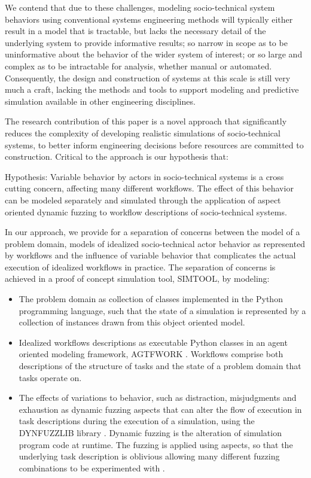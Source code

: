 \documentclass{llncs}
\begin{document}
We contend that due to these challenges, modeling socio-technical system behaviors using conventional systems
engineering methods will typically either result in a model that is tractable, but lacks the necessary detail of the
underlying system to provide informative results; so narrow in scope as to be uninformative about the behavior of the
wider system of interest; or so large and complex as to be intractable for analysis, whether manual or automated.
Consequently, the design and construction of systems at this scale is still very much a craft, lacking the methods and
tools to support modeling and predictive simulation available in other engineering disciplines.

The research contribution of this paper is a novel approach that significantly reduces the complexity of developing
realistic simulations of socio-technical systems, to better inform engineering decisions before resources are committed
to construction. Critical to the approach is our hypothesis that:

Hypothesis: Variable behavior by actors in socio-technical systems is a cross cutting concern, affecting many different
workflows. The effect of this behavior can be modeled separately and simulated through the application of aspect
oriented dynamic fuzzing to workflow descriptions of socio-technical systems.

In our approach, we provide for a separation of concerns between the model of a problem domain, models of idealized
socio-technical actor behavior as represented by workflows and the influence of variable behavior that complicates the
actual execution of idealized workflows in practice.  The separation of concerns is achieved in a proof of concept
simulation tool, SIMTOOL, by modeling:

 \begin{itemize}
 \item The problem domain as collection of classes implemented in the Python programming language, such that the
   state of a simulation is represented by a collection of instances drawn from this object oriented model.
 \item Idealized workflows descriptions as executable Python classes in an agent oriented modeling framework, AGTFWORK
   \cite{ANON}.  Workflows comprise both descriptions of the structure of tasks and the state of a problem domain that tasks
   operate on.
 \item The effects of variations to behavior, such as distraction, misjudgments and exhaustion as dynamic fuzzing
   aspects that can alter the flow of execution in task descriptions during the execution of a simulation, using the
   DYNFUZZLIB library \cite{ANON}.  Dynamic fuzzing is the alteration of simulation program code at runtime.  The fuzzing
   is applied using aspects, so that the underlying task description is oblivious allowing many different fuzzing
   combinations to be experimented with \cite{filman01aspect}.
 \end{itemize}
\end{document}
